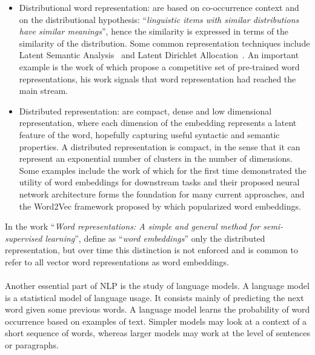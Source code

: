 \begin{itemize}[itemsep = 0.1em]
\item Distributional word representation: are based on co-occurrence context and on the distributional hypothesis:  ``\textit{linguistic items with similar distributions have similar meanings}'', hence the similarity is expressed in terms of the similarity of the distribution. Some common representation techniques include Latent Semantic Analysis~\citep{deerwester1990indexing} and Latent Dirichlet Allocation~\citep{bei2003lda, das-etal-2015-gaussian}. An important example is the work of \citet{pennington2014glove} which propose a competitive set of pre-trained word representations, his work signals that word representation had reached the main stream.

\item Distributed representation: are compact, dense and low dimensional representation, where each dimension of the embedding represents a latent feature of the word, hopefully capturing useful syntactic and semantic properties. A distributed representation is compact, in the sense that it can represent an exponential number of clusters in the number of dimensions. Some examples include the work of \citet{Collobert2008} which for the first time demonstrated the utility of word embeddings for downstream tasks and their proposed neural network architecture forms the foundation for many current approaches, and the Word2Vec framework proposed by \citet{mikolov2013distributed} which popularized word embeddings.
\end{itemize}

In the work ``\textit{Word representations: A simple and general method for semi-supervised learning}'', \citet{turian2010word} define as ``\textit{word embeddings}'' only the distributed representation, but over time this distinction is not enforced and is common to refer to all vector word representations as word embeddings.


\paragraph{}
Another essential part of NLP is the study of language models. A language model is a statistical model of language usage. It consists mainly of predicting the next word given some previous words. A language model learns the probability of word occurrence based on examples of text. Simpler models may look at a context of a short sequence of words, whereas larger models may work at the level of sentences or paragraphs.


